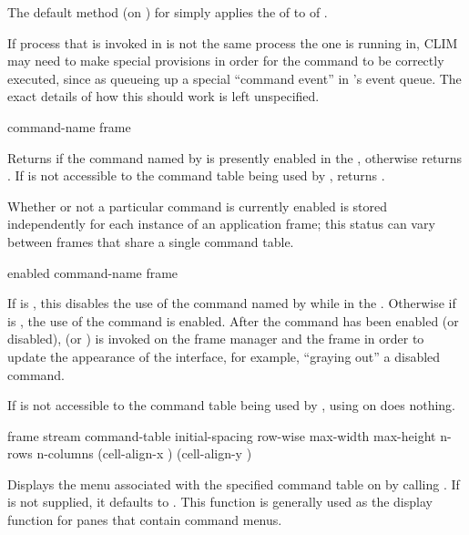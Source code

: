 The default method (on ) for
 simply applies the  of 
to  of .

If process that  is invoked in is not the same process
the one  is running in, CLIM may need to make special provisions in
order for the command to be correctly executed, since as queueing up a special
``command event'' in 's event queue.  The exact details of how this
should work is left unspecified.


 {command-name frame}

Returns  if the command named by  is presently
enabled in the  , otherwise returns .  If
 is not accessible to the command table being used by
,  returns .

Whether or not a particular command is currently enabled is stored independently
for each instance of an application frame; this status can vary between frames
that share a single command table.

 {enabled command-name frame}

If  is , this disables the use of the command named by
 while in the  .  Otherwise if
 is , the use of the command is enabled.  After the
command has been enabled (or disabled),  (or
) is invoked on the frame manager and the frame in
order to update the appearance of the interface, for example, ``graying out'' a
disabled command.

If  is not accessible to the command table being used by
, using  on  does nothing.


 {frame stream
                                    \key command-table initial-spacing row-wise
                                         max-width max-height n-rows n-columns
                                         (cell-align-x ) (cell-align-y )}

Displays the menu associated with the specified command table on  by
calling .  If  is not
supplied, it defaults to .  This function
is generally used as the display function for panes that contain command menus.

